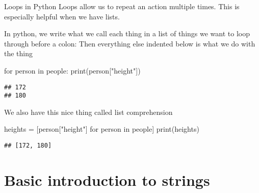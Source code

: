 \documentclass[
  10pt,
  ignorenonframetext,
  aspectratio=169]{beamer}
\newenvironment{Shaded}{\begin{snugshade}}{\end{snugshade}}
\newcommand{\BuiltInTok}[1]{\textcolor[rgb]{0.80,0.80,0.80}{#1}}
\newcommand{\ControlFlowTok}[1]{\textcolor[rgb]{0.94,0.87,0.69}{#1}}
\newcommand{\KeywordTok}[1]{\textcolor[rgb]{0.94,0.87,0.69}{#1}}
\newcommand{\NormalTok}[1]{\textcolor[rgb]{0.80,0.80,0.80}{#1}}
\newcommand{\OperatorTok}[1]{\textcolor[rgb]{0.94,0.94,0.82}{#1}}
\newcommand{\StringTok}[1]{\textcolor[rgb]{0.80,0.58,0.58}{#1}}
\begin{document}
\begin{frame}[fragile]{Loops in Python}
\protect\hypertarget{loops-in-python}{}
Loops allow us to repeat an action multiple times. This is especially
helpful when we have lists.

In python, we write what we call each thing in a list of things we want
to loop through before a colon: Then everything else indented below is
what we do with the thing

\medskip

\scriptsize

\begin{Shaded}
\begin{Highlighting}[]
\ControlFlowTok{for}\NormalTok{ person }\KeywordTok{in}\NormalTok{ people: }
    \BuiltInTok{print}\NormalTok{(person[}\StringTok{"height"}\NormalTok{])}
\end{Highlighting}
\end{Shaded}

\begin{verbatim}
## 172
## 180
\end{verbatim}

\normalsize

We also have this nice thing called list comprehension

\scriptsize

\begin{Shaded}
\begin{Highlighting}[]
\NormalTok{heights }\OperatorTok{=}\NormalTok{ [person[}\StringTok{"height"}\NormalTok{] }\ControlFlowTok{for}\NormalTok{ person }\KeywordTok{in}\NormalTok{ people] }
\BuiltInTok{print}\NormalTok{(heights)}
\end{Highlighting}
\end{Shaded}

\begin{verbatim}
## [172, 180]
\end{verbatim}
\end{frame}

\hypertarget{basic-introduction-to-strings}{%
\section{Basic introduction to
strings}\label{basic-introduction-to-strings}}
\end{document}

